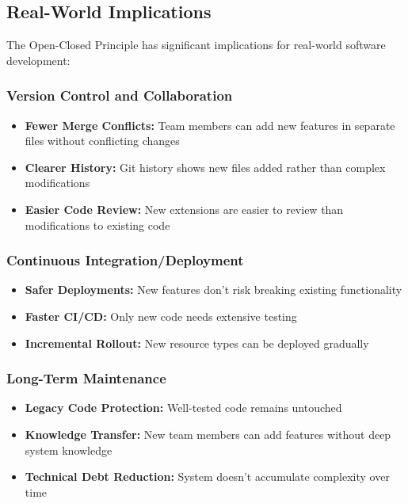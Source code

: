 \subsection{Real-World Implications}

The Open-Closed Principle has significant implications for real-world software development:

\subsubsection{Version Control and Collaboration}

\begin{itemize}
    \item \textbf{Fewer Merge Conflicts:} Team members can add new features in separate files without conflicting changes
    \item \textbf{Clearer History:} Git history shows new files added rather than complex modifications
    \item \textbf{Easier Code Review:} New extensions are easier to review than modifications to existing code
\end{itemize}

\subsubsection{Continuous Integration/Deployment}

\begin{itemize}
    \item \textbf{Safer Deployments:} New features don't risk breaking existing functionality
    \item \textbf{Faster CI/CD:} Only new code needs extensive testing
    \item \textbf{Incremental Rollout:} New resource types can be deployed gradually
\end{itemize}

\subsubsection{Long-Term Maintenance}

\begin{itemize}
    \item \textbf{Legacy Code Protection:} Well-tested code remains untouched
    \item \textbf{Knowledge Transfer:} New team members can add features without deep system knowledge
    \item \textbf{Technical Debt Reduction:} System doesn't accumulate complexity over time
\end{itemize}

